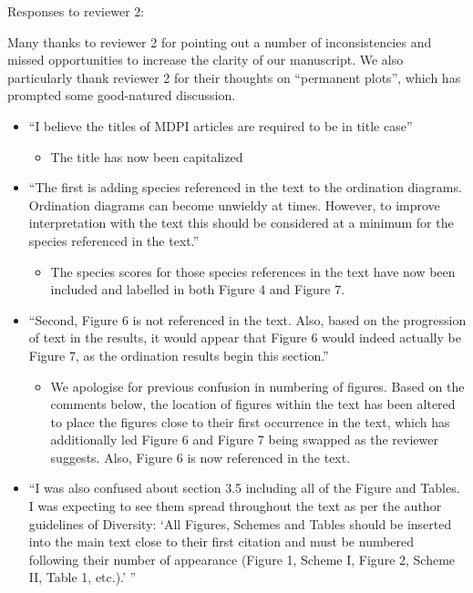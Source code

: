 \documentclass[a4paper]{letter}
\begin{document}
\begin{letter}{}
\newpage{}
Responses to reviewer 2:

Many thanks to reviewer 2 for pointing out a number of inconsistencies and missed opportunities to increase the clarity of our manuscript. We also particularly thank reviewer 2 for their thoughts on ``permanent plots'', which has prompted some good-natured discussion. 

\begin{itemize}
	\item{``I believe the titles of MDPI articles are required to be in title case''}
		\begin{itemize}
			\item{The title has now been capitalized}
		\end{itemize}
	\item{``The first is adding species referenced in the text to the ordination diagrams. Ordination diagrams can become unwieldy at times. However, to improve interpretation with the text this should be considered at a minimum for the species referenced in the text.''}
		\begin{itemize}
			\item{The species scores for those species references in the text have now been included and labelled in both Figure 4 and Figure 7.}
		\end{itemize}
	\item{``Second, Figure 6 is not referenced in the text. Also, based on the progression of text in the results, it would appear that Figure 6 would indeed actually be Figure 7, as the ordination results begin this section.''}
		\begin{itemize}
			\item{We apologise for previous confusion in numbering of figures. Based on the comments below, the location of figures within the text has been altered to place the figures close to their first occurrence in the text, which has additionally led Figure 6 and Figure 7 being swapped as the reviewer suggests. Also, Figure 6 is now referenced in the text.}
		\end{itemize}
	\item{``I was also confused about section 3.5 including all of the Figure and Tables. I was expecting to see them spread throughout the text as per the author guidelines of Diversity: `All Figures, Schemes and Tables should be inserted into the main text close to their first citation and must be numbered following their number of appearance (Figure 1, Scheme I, Figure 2, Scheme II, Table 1, etc.).' ''}
		\begin{itemize}

\end{itemize}
\end{itemize}
\end{letter}
\end{document}

